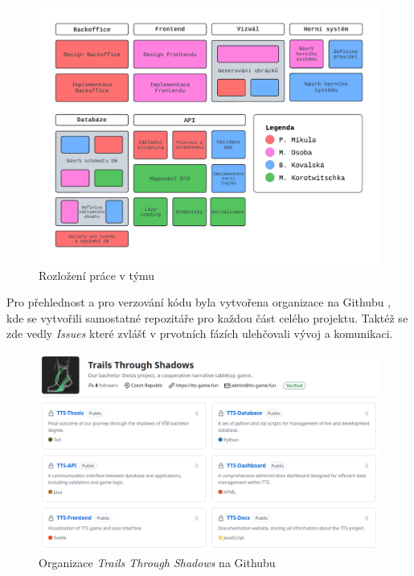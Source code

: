\begin{figure}[h]
    \centering
    \includegraphics[width=\textwidth]{../../shared/diagrams/blocks.pdf}
    \caption{Rozložení práce v týmu}
    \label{fig:job_distribution}
\end{figure}

Pro přehlednost a pro verzování kódu byla vytvořena organizace na Githubu , kde se vytvořili samostatné repozitáře pro každou část celého projektu. Taktéž se zde vedly \textit{Issues} které zvlášť v prvotních fázích ulehčovali vývoj a komunikaci. 

\begin{figure}[H]
    \centering
    \includegraphics[width=\textwidth]{../../shared/figures/gitOrg.png}
    \caption{Organizace \textit{Trails Through Shadows} na Githubu}
    \label{fig:gitOrg}
\end{figure}


